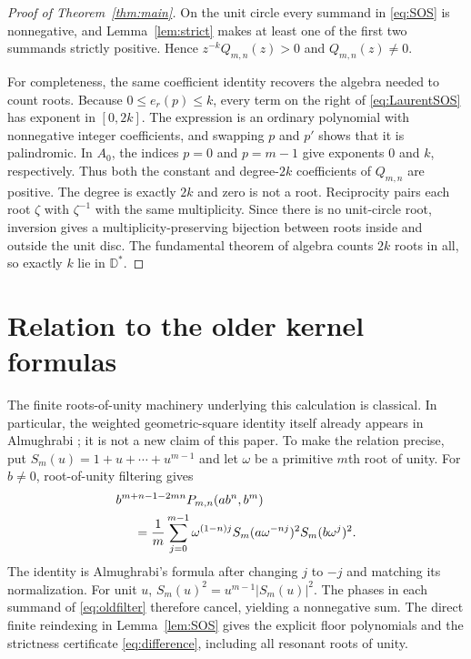 \documentclass[11pt]{article}
\newcommand{\D}{\mathbb D}
\begin{document}
\begin{proof}[Proof of Theorem~\ref{thm:main}]
On the unit circle every summand in \eqref{eq:SOS} is nonnegative,
and Lemma~\ref{lem:strict} makes at least one of the first two summands
strictly positive. Hence $z^{-k}Q_{m,n}(z)>0$ and $Q_{m,n}(z)\ne0$.

For completeness, the same coefficient identity recovers the algebra
needed to count roots. Because $0\leq e_r(p)\leq k$, every term on the
right of \eqref{eq:LaurentSOS} has exponent in $[0,2k]$. The expression
is an ordinary polynomial with nonnegative integer coefficients, and
swapping $p$ and $p'$ shows that it is palindromic. In $A_0$, the
indices $p=0$ and $p=m-1$ give exponents $0$ and $k$, respectively.
Thus both the constant and degree-$2k$ coefficients of $Q_{m,n}$ are
positive. The degree is exactly $2k$ and zero is not a root.
Reciprocity pairs each root $\zeta$ with $\zeta^{-1}$ with the same
multiplicity. Since there is no unit-circle root, inversion gives a
multiplicity-preserving bijection between roots inside and outside the
unit disc. The fundamental theorem of algebra counts $2k$ roots in
all, so exactly $k$ lie in $\D^*$.
\end{proof}

\section{Relation to the older kernel formulas}
The finite roots-of-unity machinery underlying this calculation is
classical. In particular, the weighted geometric-square identity itself
already appears in Almughrabi \cite[eq.~(24)]{Alm}; it is not a new
claim of this paper. To make the relation precise, put
$S_m(u)=1+u+\cdots+u^{m-1}$ and let $\omega$ be a primitive $m$th
root of unity. For $b\ne0$, root-of-unity filtering gives
\begin{align}\label{eq:oldfilter}
 &b^{m+n-1-2mn}P_{m,n}(ab^n,b^m)\notag\\
 &\hspace{5mm}=\frac1m\sum_{j=0}^{m-1}\omega^{(1-n)j}
 S_m(a\omega^{-nj})^2 S_m(b\omega^j)^2.
\end{align}
The identity is Almughrabi's formula after changing $j$ to $-j$ and
matching its normalization. For unit $u$,
$S_m(u)^2=u^{m-1}|S_m(u)|^2$. The phases in each summand of
\eqref{eq:oldfilter} therefore cancel, yielding a nonnegative sum.
The direct finite reindexing in Lemma~\ref{lem:SOS} gives the explicit
floor polynomials and the strictness certificate
\eqref{eq:difference}, including all resonant roots of unity.
\end{document}
